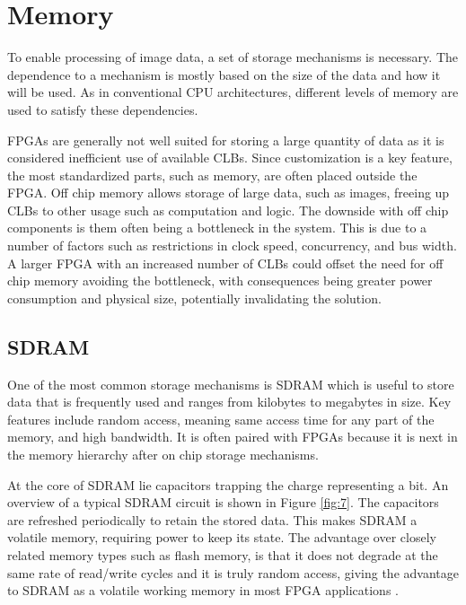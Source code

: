 \documentclass[12pt]{report}
\begin{document}
\section{Memory}
To enable processing of image data, a set of storage mechanisms is necessary. The dependence to a mechanism is mostly based on the size of the data and how it will be used. As in conventional CPU architectures, different levels of memory are used to satisfy these dependencies.
\par
FPGAs are generally not well suited for storing a large quantity of data as it is considered inefficient use of available CLBs. Since customization is a key feature, the most standardized parts, such as memory, are often placed outside the FPGA. Off chip memory allows storage of large data, such as images, freeing up CLBs to other usage such as computation and logic. The downside with off chip components is them often being a bottleneck in the system. This is due to a number of factors such as restrictions in clock speed, concurrency, and bus width. A larger FPGA with an increased number of CLBs could offset the need for off chip memory avoiding the bottleneck, with consequences being greater power consumption and physical size, potentially invalidating the solution.

\subsection{SDRAM}
One of the most common storage mechanisms is SDRAM which is useful to store data that is frequently used and ranges from kilobytes to megabytes in size. Key features include random access, meaning same access time for any part of the memory, and high bandwidth. It is often paired with FPGAs because it is next in the memory hierarchy after on chip storage mechanisms.
\par
At the core of SDRAM lie capacitors trapping the charge representing a bit. An overview of a typical SDRAM circuit is shown in Figure \ref{fig:7}. The capacitors are refreshed periodically to retain the stored data. This makes SDRAM a volatile memory, requiring power to keep its state. The advantage over closely related memory types such as flash memory, is that it does not degrade at the same rate of read/write cycles and it is truly random access, giving the advantage to SDRAM as a volatile working memory in most FPGA applications \citep{SDRAMFLASH} \citep{NANDNORFlash}.
\end{document}
